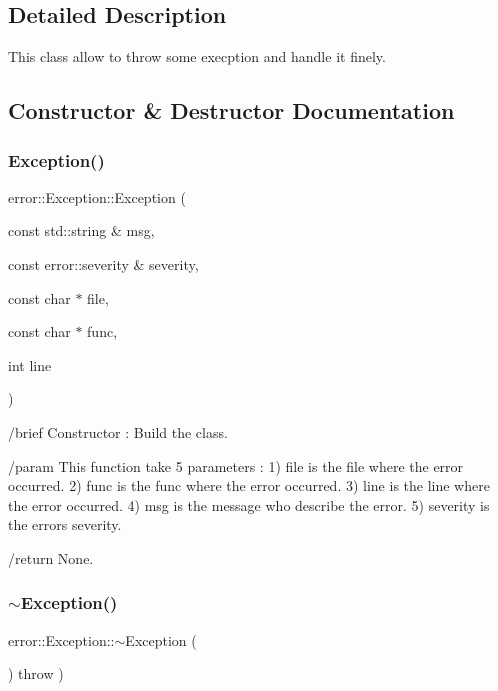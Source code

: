 \subsection{Detailed Description}
This class allow to throw some execption and handle it finely. 

\subsection{Constructor \& Destructor Documentation}
\mbox{\label{classerror_1_1Exception_ae9193ed1c5b211c31c239c5f30caefb4}} 
\subsubsection{\texorpdfstring{Exception()}{Exception()}}
{\footnotesize\ttfamily error\+::\+Exception\+::\+Exception (\begin{DoxyParamCaption}\item[{const std\+::string \&}]{msg,  }\item[{const error\+::severity \&}]{severity,  }\item[{const char $\ast$}]{file,  }\item[{const char $\ast$}]{func,  }\item[{int}]{line }\end{DoxyParamCaption})}



/brief Constructor \+: Build the class. 

/param This function take 5 parameters \+: 1) \textquotesingle{}file\textquotesingle{} is the file where the error occurred. 2) \textquotesingle{}func\textquotesingle{} is the func where the error occurred. 3) \textquotesingle{}line\textquotesingle{} is the line where the error occurred. 4) \textquotesingle{}msg\textquotesingle{} is the message who describe the error. 5) \textquotesingle{}severity\textquotesingle{} is the error\textquotesingle{}s severity.

/return None. \mbox{\label{classerror_1_1Exception_a1350d8f9d039facfd991b6782387eae5}} 
\subsubsection{\texorpdfstring{$\sim$\+Exception()}{~Exception()}}
{\footnotesize\ttfamily error\+::\+Exception\+::$\sim$\+Exception (\begin{DoxyParamCaption}{ }\end{DoxyParamCaption}) throw  ) \hspace{0.3cm}{\ttfamily [inline]}}



